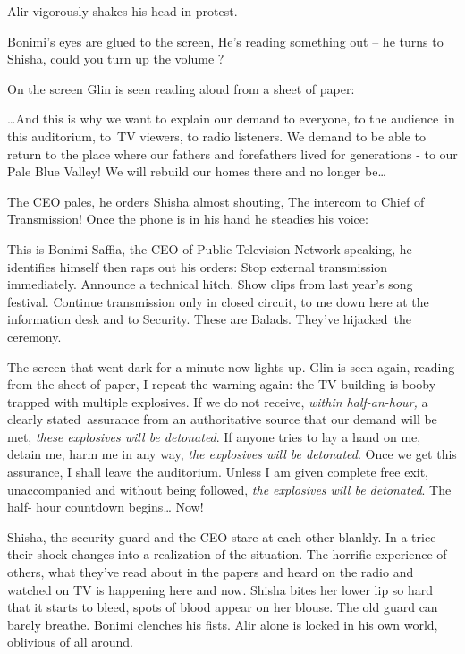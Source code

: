 \documentclass[letterpaper]{article}
\begin{document}
Alir vigorously shakes his head in protest. 

Bonimi's eyes are glued to the screen, {\textquotedbl}He's reading something out --{\textquotedbl} he turns to Shisha,
{\textquotedbl}could you turn up the volume ?{\textquotedbl}

On the screen Glin is seen reading aloud from a sheet of paper:

{\textquotedbl}{\dots}And this is why we want to explain our demand to everyone, to the audience~in this auditorium,
to~TV viewers, to radio listeners. We demand to be able to return to the place where our fathers and forefathers lived
for generations - to our Pale Blue Valley! We will rebuild our homes there and no longer be{\dots}{\textquotedbl}

The CEO pales, he orders Shisha almost shouting, {\textquotedbl}The intercom to Chief of Transmission!{\textquotedbl}
Once the phone is in his hand he steadies his voice:

{\textquotedbl}This is Bonimi Saffia, the CEO of Public Television Network speaking,{\textquotedbl} he identifies
himself then raps out his orders: {\textquotedbl}Stop external transmission immediately. Announce a technical hitch.
Show clips from last year's song festival. Continue transmission only in closed circuit, to me down here at the
information desk and to Security. These are Balads. They've hijacked~the ceremony.{\textquotedbl}~~~~~~ 

The screen that went dark for a minute now lights up. Glin is seen again, reading from the sheet of paper,
{\textquotedbl}I repeat the warning again: the TV building is booby-trapped with multiple explosives. If we do not
receive, \textit{within half-an-hour,} a clearly stated~assurance from an authoritative source that our demand will be
met, \textit{these explosives will be detonated}. If anyone tries to lay a hand on me, detain me, harm me in any way,
\textit{the explosives will be detonated}. Once we get this assurance, I shall leave the auditorium. Unless I am given
complete free exit, unaccompanied and without\textcolor[rgb]{0.0,0.4392157,0.7529412}{ }being followed, \textit{the
explosives will be detonated}. The half- hour countdown begins{\dots} Now!{\textquotedbl}

Shisha, the security guard and the CEO stare at each other\textcolor[rgb]{0.0,0.4392157,0.7529412}{ }blankly. In a trice
their shock changes into a realization of the situation. The horrific experience of others, what they've read about in
the papers and heard on the radio and watched on TV is happening here and now. Shisha bites her lower lip so hard that
it starts to bleed, spots of blood appear\textcolor[rgb]{0.0,0.4392157,0.7529412}{ }on her blouse. The old guard can
barely breathe. Bonimi clenches his fists. Alir alone is locked in his own world, oblivious of all around. 
\end{document}
